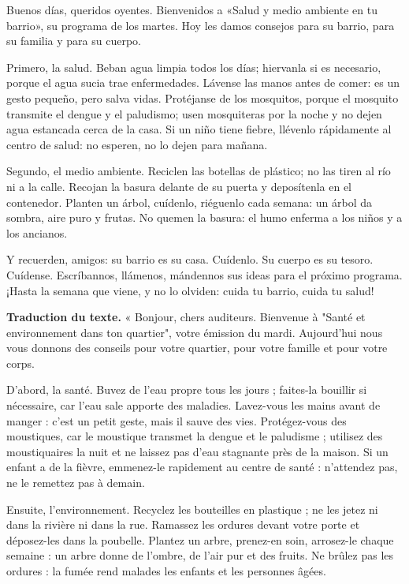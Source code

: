\documentclass[11pt]{article}
\begin{document}
\begin{textebox}
Buenos días, queridos oyentes. Bienvenidos a «Salud y medio ambiente en tu barrio», su programa de los martes. Hoy les damos consejos para su barrio, para su familia y para su cuerpo.

Primero, la salud. Beban agua limpia todos los días; hiervanla si es necesario, porque el agua sucia trae enfermedades. Lávense las manos antes de comer: es un gesto pequeño, pero salva vidas. Protéjanse de los mosquitos, porque el mosquito transmite el dengue y el paludismo; usen mosquiteras por la noche y no dejen agua estancada cerca de la casa. Si un niño tiene fiebre, llévenlo rápidamente al centro de salud: no esperen, no lo dejen para mañana.

Segundo, el medio ambiente. Reciclen las botellas de plástico; no las tiren al río ni a la calle. Recojan la basura delante de su puerta y deposítenla en el contenedor. Planten un árbol, cuídenlo, riéguenlo cada semana: un árbol da sombra, aire puro y frutas. No quemen la basura: el humo enferma a los niños y a los ancianos.

Y recuerden, amigos: su barrio es su casa. Cuídenlo. Su cuerpo es su tesoro. Cuídense. Escríbannos, llámenos, mándennos sus ideas para el próximo programa. ¡Hasta la semana que viene, y no lo olviden: cuida tu barrio, cuida tu salud!
\end{textebox}

\textbf{Traduction du texte.} « Bonjour, chers auditeurs. Bienvenue à "Santé et environnement dans ton quartier", votre émission du mardi. Aujourd'hui nous vous donnons des conseils pour votre quartier, pour votre famille et pour votre corps.

D'abord, la santé. Buvez de l'eau propre tous les jours ; faites-la bouillir si nécessaire, car l'eau sale apporte des maladies. Lavez-vous les mains avant de manger : c'est un petit geste, mais il sauve des vies. Protégez-vous des moustiques, car le moustique transmet la dengue et le paludisme ; utilisez des moustiquaires la nuit et ne laissez pas d'eau stagnante près de la maison. Si un enfant a de la fièvre, emmenez-le rapidement au centre de santé : n'attendez pas, ne le remettez pas à demain.

Ensuite, l'environnement. Recyclez les bouteilles en plastique ; ne les jetez ni dans la rivière ni dans la rue. Ramassez les ordures devant votre porte et déposez-les dans la poubelle. Plantez un arbre, prenez-en soin, arrosez-le chaque semaine : un arbre donne de l'ombre, de l'air pur et des fruits. Ne brûlez pas les ordures : la fumée rend malades les enfants et les personnes âgées.
\end{document}
